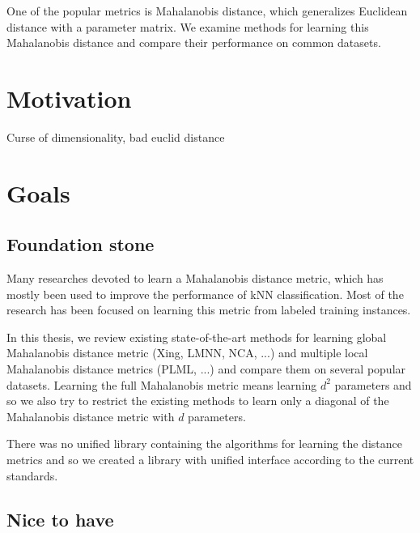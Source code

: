 \documentclass[12pt,a4paper]{report}
\begin{document}
One of the popular metrics is Mahalanobis distance, which generalizes Euclidean distance with a parameter matrix. We examine methods for learning this Mahalanobis distance and compare their performance on common datasets.




\section{Motivation}

Curse of dimensionality, bad euclid distance


\section{Goals}

\subsection{Foundation stone}

Many researches devoted to learn a Mahalanobis distance metric, which has mostly been used to improve the performance of kNN classification. Most of the research has been focused on learning this metric from labeled training instances.

In this thesis, we review existing state-of-the-art methods for learning global Mahalanobis distance metric (Xing, LMNN, NCA, ...) and multiple local Mahalanobis distance metrics (PLML, ...) and compare them on several popular datasets. Learning the full Mahalanobis metric means learning $d^2$ parameters and so we also try to restrict the existing methods to learn only a diagonal of the Mahalanobis distance metric with $d$ parameters.

There was no unified library containing the algorithms for learning the distance metrics and so we created a library with unified interface according to the current standards.

\subsection{Nice to have}
\end{document}
